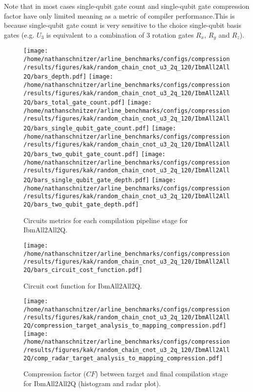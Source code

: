 \documentclass{report}%
\begin{document}
%
Note that in most cases single-qubit gate count and single-qubit gate compression factor
                have only limited meaning as a metric of compiler performance.This is because single-qubit
                gate count is very sensitive to the choice single-qubit basis gates (e.g. $U_3$ is
                equivalent to a combination of 3 rotation gates $R_x$, $R_y$ and $R_z$).%


\begin{figure}[h!]%
\centering%
\texttt{[image: /home/nathanschnitzer/arline\_benchmarks/configs/compression/results/figures/kak/random\_chain\_cnot\_u3\_2q\_120/IbmAll2All2Q/bars\_depth.pdf]}%
\centering%
\texttt{[image: /home/nathanschnitzer/arline\_benchmarks/configs/compression/results/figures/kak/random\_chain\_cnot\_u3\_2q\_120/IbmAll2All2Q/bars\_total\_gate\_count.pdf]}%
\linebreak%
\centering%
\texttt{[image: /home/nathanschnitzer/arline\_benchmarks/configs/compression/results/figures/kak/random\_chain\_cnot\_u3\_2q\_120/IbmAll2All2Q/bars\_single\_qubit\_gate\_count.pdf]}%
\centering%
\texttt{[image: /home/nathanschnitzer/arline\_benchmarks/configs/compression/results/figures/kak/random\_chain\_cnot\_u3\_2q\_120/IbmAll2All2Q/bars\_two\_qubit\_gate\_count.pdf]}%
\linebreak%
\centering%
\texttt{[image: /home/nathanschnitzer/arline\_benchmarks/configs/compression/results/figures/kak/random\_chain\_cnot\_u3\_2q\_120/IbmAll2All2Q/bars\_single\_qubit\_gate\_depth.pdf]}%
\centering%
\texttt{[image: /home/nathanschnitzer/arline\_benchmarks/configs/compression/results/figures/kak/random\_chain\_cnot\_u3\_2q\_120/IbmAll2All2Q/bars\_two\_qubit\_gate\_depth.pdf]}%
\linebreak%
\caption{Circuits metrics for each compilation pipeline stage for IbmAll2All2Q.}%
\end{figure}

%


\begin{figure}[h!]%
\centering%
\texttt{[image: /home/nathanschnitzer/arline\_benchmarks/configs/compression/results/figures/kak/random\_chain\_cnot\_u3\_2q\_120/IbmAll2All2Q/bars\_circuit\_cost\_function.pdf]}%
\caption{Circuit cost function for IbmAll2All2Q.}%
\end{figure}

%


\begin{figure}[h!]%
\centering%
\texttt{[image: /home/nathanschnitzer/arline\_benchmarks/configs/compression/results/figures/kak/random\_chain\_cnot\_u3\_2q\_120/IbmAll2All2Q/compression\_target\_analysis\_to\_mapping\_compression.pdf]}%
\centering%
\texttt{[image: /home/nathanschnitzer/arline\_benchmarks/configs/compression/results/figures/kak/random\_chain\_cnot\_u3\_2q\_120/IbmAll2All2Q/comp\_radar\_target\_analysis\_to\_mapping\_compression.pdf]}%
\caption{Compression factor ($CF$) between target and final compilation stage for IbmAll2All2Q
                        (histogram and radar plot).
                        }%
\end{figure}
\end{document}
